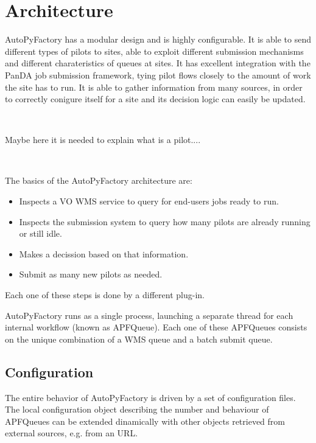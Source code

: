 \documentclass[a4paper]{jpconf}
\begin{document}
\subsection{}

\section{Architecture}


AutoPyFactory has a modular design and is highly configurable. 
It is able to send different types of pilots to sites, 
able to exploit different submission mechanisms and different charateristics of queues at sites. 
It has excellent integration with the PanDA job submission framework, 
tying pilot flows closely to the amount of work the site has to run. 
It is able to gather information from many sources, 
in order to correctly conigure itself for a site and its decision logic can easily be updated.

~

Maybe here it is needed to explain what is a pilot....

~

The basics of the AutoPyFactory architecture are:
\begin{itemize}
    \item Inspects a VO WMS service to query for end-users jobs ready to run.
    \item Inspects the submission system to query how many pilots are already running or still idle.
    \item Makes a decission based on that information.
    \item Submit as many new pilots as needed.
\end{itemize}

Each one of these steps is done by a different plug-in.

AutoPyFactory runs as a single process,
launching a separate thread for each internal workflow (known as APFQueue).
Each one of these APFQueues consists on the unique combination of a WMS queue and a batch submit queue.

\subsection{Configuration}

The entire behavior of AutoPyFactory is driven by a set of configuration files.
The local configuration object describing the number and behaviour of APFQueues 
can be extended dinamically with other objects retrieved from external sources, 
e.g. from an URL.
\end{document}
